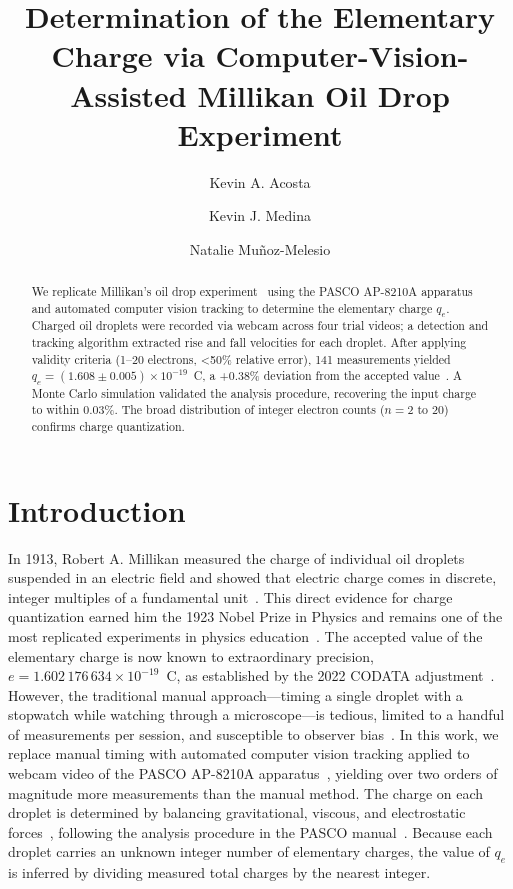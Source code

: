 \documentclass[%
 reprint,
 amsmath,amssymb,
 aps,
]{revtex4-2}
\begin{document}
\title{Determination of the Elementary Charge via Computer-Vision-Assisted Millikan Oil Drop Experiment}

\author{Kevin A. Acosta}
\author{Kevin J. Medina}
\author{Natalie Muñoz-Melesio}

\begin{abstract}
We replicate Millikan's oil drop experiment~\cite{Millikan1913} using the PASCO AP-8210A apparatus~\cite{PASCO-AP8210A} and automated computer vision tracking to determine the elementary charge \(q_e\). Charged oil droplets were recorded via webcam across four trial videos; a detection and tracking algorithm extracted rise and fall velocities for each droplet. After applying validity criteria (1--20 electrons, \textless 50\% relative error), 141 measurements yielded \(q_e = (1.608 \pm 0.005) \times 10^{-19}\)~C, a +0.38\% deviation from the accepted value~\cite{NIST-e-2022}. A Monte Carlo simulation validated the analysis procedure, recovering the input charge to within 0.03\%. The broad distribution of integer electron counts ($n = 2$ to $20$) confirms charge quantization.
\end{abstract}


\maketitle


\section{Introduction}

In 1913, Robert A. Millikan measured the charge of individual oil droplets suspended in an electric field and showed that electric charge comes in discrete, integer multiples of a fundamental unit~\cite{Millikan1913}. This direct evidence for charge quantization earned him the 1923 Nobel Prize in Physics and remains one of the most replicated experiments in physics education~\cite{Franklin1997}. The accepted value of the elementary charge is now known to extraordinary precision, $e = 1.602\,176\,634 \times 10^{-19}$~C, as established by the 2022 CODATA adjustment~\cite{NIST-e-2022}. However, the traditional manual approach---timing a single droplet with a stopwatch while watching through a microscope---is tedious, limited to a handful of measurements per session, and susceptible to observer bias~\cite{Heering2010}. In this work, we replace manual timing with automated computer vision tracking applied to webcam video of the PASCO AP-8210A apparatus~\cite{PASCO-AP8210A}, yielding over two orders of magnitude more measurements than the manual method. The charge on each droplet is determined by balancing gravitational, viscous, and electrostatic forces~\cite{Griffiths2017}, following the analysis procedure in the PASCO manual~\cite{PASCO-AP8210A}. Because each droplet carries an unknown integer number of elementary charges, the value of \(q_e\) is inferred by dividing measured total charges by the nearest integer.
\end{document}
